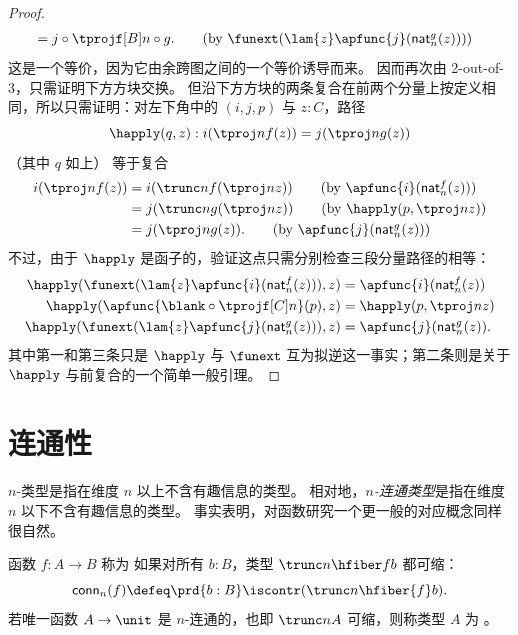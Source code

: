 \begin{proof}
\begin{align}
    &= j\circ \tprojf[B]n \circ g.
    \tag{by $\funext(\lam{z} \apfunc{j}(\mathsf{nat}^g_n(z)))$}
  \end{align}
  这是一个等价，因为它由余跨图之间的一个等价诱导而来。
  因而再次由 2-out-of-3，只需证明下方方块交换。
  但沿下方方块的两条复合在前两个分量上按定义相同，所以只需证明：对左下角中的 $(i,j,p)$ 与 $z:C$，路径
  \[ \happly(q,z) : i(\tproj n{f(z)}) = j(\tproj n{g(z)}) \]
  （其中 $q$ 如上）
  等于复合
  \begin{align}
    i(\tproj n{f(z)})
    &= i(\trunc nf(\tproj nz))
    \tag{by $\apfunc{i}(\mathsf{nat}^f_n(z))$}\\
    &= j(\trunc ng(\tproj nz))
    \tag{by $\happly(p,\tproj nz)$}\\
    &= j(\tproj n{g(z)}).
    \tag{by $\apfunc{j}(\mathsf{nat}^g_n(z))$}
  \end{align}
  不过，由于 $\happly$ 是函子的，验证这点只需分别检查三段分量路径的相等：
  \begin{align*}
    \happly({\funext(\lam{z} \apfunc{i}(\mathsf{nat}^f_n(z)))},z)
    &= {\apfunc{i}(\mathsf{nat}^f_n(z))}\\
    \happly(\apfunc{\blank\circ \tprojf[C] n}(p), z)
    &= {\happly(p,\tproj nz)}\\
    \happly({\funext(\lam{z} \apfunc{j}(\mathsf{nat}^g_n(z)))},z)
    &= {\apfunc{j}(\mathsf{nat}^g_n(z))}.
  \end{align*}
  其中第一和第三条只是 $\happly$ 与 $\funext$ 互为拟逆这一事实；第二条则是关于 $\happly$ 与前复合的一个简单一般引理。
\end{proof}

\section{连通性}
\label{sec:connectivity}

$n$-类型是指在维度 $n$ 以上不含有趣信息的类型。
相对地，\emph{$n$-连通类型}是指在维度 $n$ 以下不含有趣信息的类型。
事实表明，对函数研究一个更一般的对应概念同样很自然。

\begin{defn}
函数 $f:A\to B$ 称为 
%
%
如果对所有 $b:B$，类型 $\trunc n{\hfiber f b}$ 都可缩：
\begin{equation*}
  \mathsf{conn}_n(f)\defeq \prd{b:B}\iscontr(\trunc n{\hfiber{f}b}).
\end{equation*}
若唯一函数 $A\to\unit$ 是 $n$-连通的，也即 $\trunc nA$ 可缩，则称类型 $A$ 为 
%
%
。
\end{defn}

